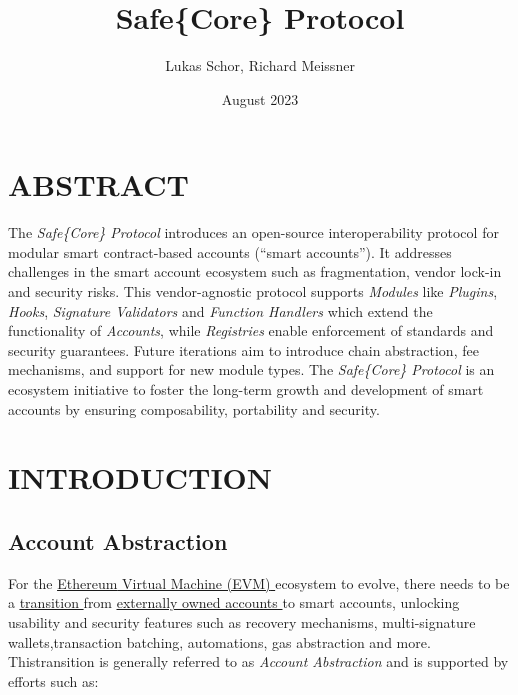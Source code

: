 \documentclass[
]{article}
\title{Safe\{Core\} Protocol}
\author{Lukas Schor, Richard Meissner}
\date{August 2023}
\begin{document}
\maketitle

\hypertarget{abstract}{%
  \section{ABSTRACT}\label{abstract}}

The \emph{Safe\{Core\} Protocol} introduces an open-source interoperability protocol for modular smart contract-based accounts (``smart accounts''). It addresses challenges in the smart account ecosystem such as fragmentation, vendor lock-in and security risks. This vendor-agnostic protocol supports \emph{Modules} like \emph{Plugins}, \emph{Hooks}, \emph{Signature Validators} and \emph{Function Handlers} which extend the functionality of \emph{Accounts}, while \emph{Registries} enable enforcement of standards and security guarantees. Future iterations aim to introduce chain abstraction, fee mechanisms, and support for new module types. The \emph{Safe\{Core\} Protocol} is an ecosystem initiative to foster the long-term growth and development of smart accounts by ensuring composability, portability and security.

\hypertarget{introduction}{%
  \section{INTRODUCTION}\label{introduction}}
\hypertarget{account-abstraction}{%
  \subsection{Account Abstraction}\label{account-abstraction}}

For the
\href{https://ethereum.org/en/developers/docs/evm/}{
  \uline{Ethereum}
  \uline{Virtual Machine (EVM)}
}
ecosystem to evolve, there needs to be a
\href{https://vitalik.ca/general/2023/06/09/three_transitions.html}{
  \uline{transition}
}
from
\href{https://ethereum.org/en/developers/docs/accounts/}{
  \uline{externally owned accounts}
}
to smart accounts, unlocking usability and security features such as recovery mechanisms, multi-signature wallets,transaction batching, automations, gas abstraction and more. Thistransition is generally referred to as \emph{Account Abstraction} and is supported by efforts such as:
\end{document}

